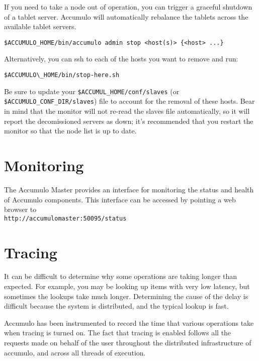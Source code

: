 If you need to take a node out of operation, you can trigger a graceful shutdown of a tablet 
server. Accumulo will automatically rebalance the tablets across the available tablet servers.

\begingroup\fontsize{8pt}{8pt}\selectfont\begin{verbatim}
$ACCUMULO_HOME/bin/accumulo admin stop <host(s)> {<host> ...}
\end{verbatim}\endgroup

Alternatively, you can ssh to each of the hosts you want to remove and run:

\begingroup\fontsize{8pt}{8pt}\selectfont\begin{verbatim}
$ACCUMULO\_HOME/bin/stop-here.sh
\end{verbatim}\endgroup

Be sure to update your \texttt{\$ACCUMUL\_HOME/conf/slaves} (or \texttt{\$ACCUMULO\_CONF\_DIR/slaves}) file to 
account for the removal of these hosts. Bear in mind that the monitor will not re-read the 
slaves file automatically, so it will report the decomissioned servers as down; it's 
recommended that you restart the monitor so that the node list is up to date.

\section{Monitoring}

The Accumulo Master provides an interface for monitoring the status and health of
Accumulo components. This interface can be accessed by pointing a web browser to\\
\texttt{http://accumulomaster:50095/status}

\section{Tracing}
It can be difficult to determine why some operations are taking longer
than expected. For example, you may be looking up items with very low
latency, but sometimes the lookups take much longer. Determining the
cause of the delay is difficult because the system is distributed, and
the typical lookup is fast.

Accumulo has been instrumented to record the time that various
operations take when tracing is turned on. The fact that tracing is
enabled follows all the requests made on behalf of the user throughout
the distributed infrastructure of accumulo, and across all threads of
execution.

